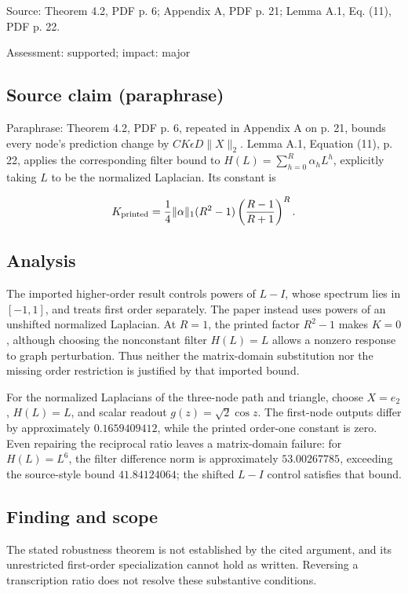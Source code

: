 \documentclass[11pt]{article}
\begin{document}
Source: Theorem 4.2, PDF p. 6; Appendix A, PDF p. 21; Lemma A.1, Eq. (11), PDF p. 22.

Assessment: supported; impact: major

\subsection*{Source claim (paraphrase)}

Paraphrase: Theorem 4.2, PDF p. 6, repeated in Appendix A on p. 21, bounds every node’s prediction change by \(CK\epsilon D\|X\|_2\). Lemma A.1, Equation (11), p. 22, applies the corresponding filter bound to \(H(L)=\sum_{h=0}^{R}\alpha_hL^h\), explicitly taking \(L\) to be the normalized Laplacian. Its constant is

\[K_{\rm printed}=\frac14\|\alpha\|_1(R^2-1) \left(\frac{R-1}{R+1}\right)^R.\]

\subsection*{Analysis}

The imported higher-order result controls powers of \(L-I\), whose spectrum lies in \([-1,1]\), and treats first order separately. The paper instead uses powers of an unshifted normalized Laplacian. At \(R=1\), the printed factor \(R^2-1\) makes \(K=0\), although choosing the nonconstant filter \(H(L)=L\) allows a nonzero response to graph perturbation. Thus neither the matrix-domain substitution nor the missing order restriction is justified by that imported bound.

For the normalized Laplacians of the three-node path and triangle, choose \(X=e_2\), \(H(L)=L\), and scalar readout \(g(z)=\sqrt2\cos z\). The first-node outputs differ by approximately \(0.1659409412\), while the printed order-one constant is zero. Even repairing the reciprocal ratio leaves a matrix-domain failure: for \(H(L)=L^6\), the filter difference norm is approximately \(53.00267785\), exceeding the source-style bound \(41.84124064\); the shifted \(L-I\) control satisfies that bound.

\subsection*{Finding and scope}

The stated robustness theorem is not established by the cited argument, and its unrestricted first-order specialization cannot hold as written. Reversing a transcription ratio does not resolve these substantive conditions.
\end{document}
